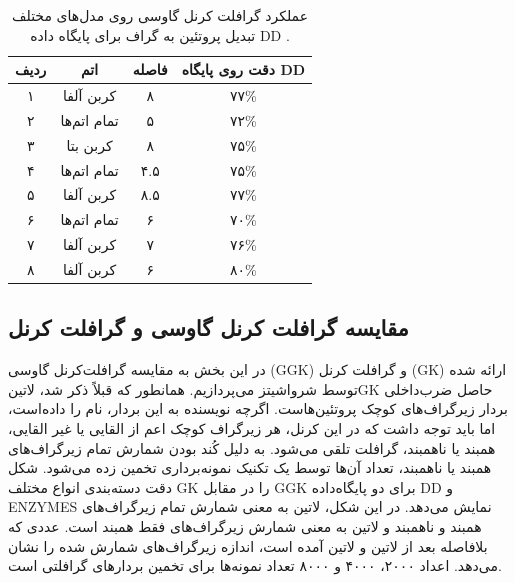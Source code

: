\begin{table}[ht]
\centering
\begin{tabular}{| c | c | c | c |}
    \hline
    ردیف & اتم & فاصله & دقت روی پایگاه DD \\ \hline
۱ & کربن آلفا & ۸ & ۷۷\% \\ \hline
۲ & تمام اتم‌ها & ۵ & ۷۲\% \\ \hline
۳ & کربن بتا & ۸ & ۷۵\% \\ \hline
۴ & تمام اتم‌ها & ۴.۵ & ۷۵\% \\ \hline
۵ & کربن آلفا & ۸.۵ & ۷۷\% \\ \hline
۶ & تمام اتم‌ها & ۶ & ۷۰\% \\ \hline
۷ & کربن آلفا & ۷ & ۷۶\% \\ \hline
۸ & کربن آلفا & ۶ & ۸۰\% \\ \hline
\end{tabular}
\caption{
عملکرد گرافلت کرنل گاوسی روی مدل‌های مختلف تبدیل پروتئین به گراف برای پایگاه داده DD .
}
\label{tab:ggk-on-rigs}
\end{table}

\subsection{مقایسه گرافلت کرنل گاوسی و گرافلت کرنل}
در این بخش به مقایسه گرافلت‌کرنل گاوسی (GGK) و گرافلت کرنل (GK) ارائه شده توسط شرواشیتز می‌پردازیم. همانطور که قبلاً ذکر شد، ‌لاتین{GK} حاصل ضرب‌داخلی بردار زیرگراف‌های کوچک پروتئین‌هاست. اگرچه نویسنده به این بردار، نام  را داده‌است، اما باید توجه داشت که در این کرنل، هر زیرگراف کوچک اعم از القایی یا غیر القایی، همبند یا ناهمبند، گرافلت تلقی می‌شود. به دلیل کُند بودن شمارش تمام زیرگراف‌های همبند یا ناهمبند، تعداد آن‌ها توسط یک تکنیک نمونه‌برداری تخمین زده می‌شود. شکل  دقت دسته‌بندی انواع مختلف GK را در مقابل GGK برای دو پایگاه‌داده DD و ENZYMES نمایش می‌دهد. در این شکل، ‌لاتین{} به معنی شمارش تمام زیرگراف‌های همبند و ناهمبند و ‌لاتین{} به معنی شمارش زیرگراف‌های فقط همبند است. عددی که بلافاصله بعد از ‌لاتین{} و ‌لاتین{} آمده است، اندازه زیرگراف‌های شمارش شده را نشان می‌دهد. اعداد ۲۰۰۰، ۴۰۰۰ و ۸۰۰۰ تعداد نمونه‌ها برای تخمین بردارهای گرافلتی است.

